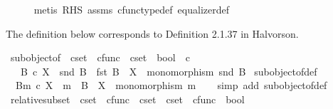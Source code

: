 \begin{isabellebody}
\ \ \ \ \isamarkupfalse%
\ {\isacharparenleft}{\kern0pt}metis\ RHS\ assms{\isacharparenleft}{\kern0pt}{}{\isacharcomma}{\kern0pt}{}{\isacharcomma}{\kern0pt}{}{\isacharparenright}{\kern0pt}\ cfunc{\isacharunderscore}{\kern0pt}type{\isacharunderscore}{\kern0pt}def\ equalizer{\isacharunderscore}{\kern0pt}def{\isacharparenright}{\kern0pt}\isanewline
{}\isamarkupfalse%
%
\endisatagproof
{\isafoldproof}%
%
\isadelimproof
%
\endisadelimproof
%
\begin{isamarkuptext}%
The definition below corresponds to Definition 2.1.37 in Halvorson.%
\end{isamarkuptext}\isamarkuptrue%
\isamarkupfalse%
\ subobject{\isacharunderscore}{\kern0pt}of\ {\isacharcolon}{\kern0pt}{\isacharcolon}{\kern0pt}\ {\isachardoublequoteopen}cset\ {\isasymtimes}\ cfunc\ {\isasymRightarrow}\ cset\ {\isasymRightarrow}\ bool{\isachardoublequoteclose}\ {\isacharparenleft}{\kern0pt}\ {\isachardoublequoteopen}{\isasymsubseteq}\isactrlsub c{\isachardoublequoteclose}\ {}{}{\isacharparenright}{\kern0pt}\isanewline
\ \ \ {\isachardoublequoteopen}B\ {\isasymsubseteq}\isactrlsub c\ X\ {\isasymlongleftrightarrow}\ {\isacharparenleft}{\kern0pt}snd\ B\ {\isacharcolon}{\kern0pt}\ fst\ B\ {\isasymrightarrow}\ X\ {\isasymand}\ monomorphism\ {\isacharparenleft}{\kern0pt}snd\ B{\isacharparenright}{\kern0pt}{\isacharparenright}{\kern0pt}{\isachardoublequoteclose}\isanewline
\isanewline
{}\isamarkupfalse%
\ subobject{\isacharunderscore}{\kern0pt}of{\isacharunderscore}{\kern0pt}def{}{\isacharcolon}{\kern0pt}\isanewline
\ \ {\isachardoublequoteopen}{\isacharparenleft}{\kern0pt}B{\isacharcomma}{\kern0pt}m{\isacharparenright}{\kern0pt}\ {\isasymsubseteq}\isactrlsub c\ X\ {\isacharequal}{\kern0pt}\ {\isacharparenleft}{\kern0pt}m\ {\isacharcolon}{\kern0pt}\ B\ {\isasymrightarrow}\ X\ {\isasymand}\ monomorphism\ m{\isacharparenright}{\kern0pt}{\isachardoublequoteclose}\isanewline
%
\isadelimproof
\ \ %
\endisadelimproof
%
\isatagproof
{}\isamarkupfalse%
\ {\isacharparenleft}{\kern0pt}simp\ add{\isacharcolon}{\kern0pt}\ subobject{\isacharunderscore}{\kern0pt}of{\isacharunderscore}{\kern0pt}def{\isacharparenright}{\kern0pt}%
\endisatagproof
{\isafoldproof}%
%
\isadelimproof
\isanewline
%
\endisadelimproof
\isanewline
{}\isamarkupfalse%
\ relative{\isacharunderscore}{\kern0pt}subset\ {\isacharcolon}{\kern0pt}{\isacharcolon}{\kern0pt}\ {\isachardoublequoteopen}cset\ {\isasymtimes}\ cfunc\ {\isasymRightarrow}\ cset\ {\isasymRightarrow}\ cset\ {\isasymtimes}\ cfunc\ {\isasymRightarrow}\ bool{\isachardoublequoteclose}\ {\isacharparenleft}{\kern0pt}{\isachardoublequoteopen}{\isacharunderscore}{\kern0pt}{\isasymsubseteq}\isactrlbsub {\isacharunderscore}{\kern0pt}\isactrlesub {\isacharunderscore}{\kern0pt}{\isachardoublequoteclose}\ {\isacharbrackleft}{\kern0pt}{}{}{\isacharcomma}{\kern0pt}{}{}{\isacharcomma}{\kern0pt}{}{}{\isacharbrackright}{\kern0pt}{}{}{\isacharparenright}{\kern0pt}\isanewline

\end{isabellebody}
